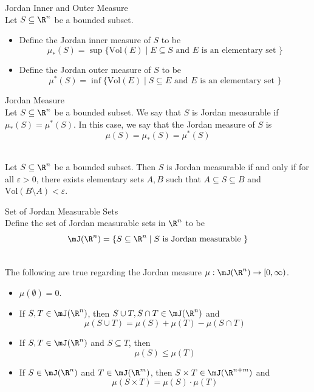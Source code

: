 \documentclass[a4paper]{article}
\begin{document}
\begin{defn}{Jordan Inner and Outer Measure}{}\\
Let $S\subseteq\R^n$ be a bounded subset. 
\begin{itemize}
\item Define the Jordan inner measure of $S$ to be $$\mu_\ast(S)=\sup\{\text{Vol}(E)\;|\;E\subseteq S\text{ and }E\text{ is an elementary set }\}$$
\item Define the Jordan outer measure of $S$ to be $$\mu^\ast(S)=\inf\{\text{Vol}(E)\;|\;S\subseteq E\text{ and }E\text{ is an elementary set }\}$$
\end{itemize}
\end{defn}

\begin{defn}{Jordan Measure}{}\\
Let $S\subseteq\R^n$ be a bounded subset. We say that $S$ is Jordan measurable if $\mu_\ast(S)=\mu^\ast(S)$. In this case, we say that the Jordan measure of $S$ is $$\mu(S)=\mu_\ast(S)=\mu^\ast(S)$$
\end{defn}

\begin{prp}{}{}\\
Let $S\subseteq\R^n$ be a bounded subset. Then $S$ is Jordan measurable if and only if for all $\varepsilon>0$, there exists elementary sets $A,B$ such that $A\subseteq S\subseteq B$ and $\text{Vol}(B\setminus A)<\varepsilon$. 
\end{prp}

\begin{defn}{Set of Jordan Measurable Sets}{}\\
Define the set of Jordan measurable sets in $\R^n$ to be $$\mJ(\R^n)=\{S\subseteq\R^n\;|\;S\text{ is Jordan measurable }\}$$
\end{defn}

\begin{prp}{}{}\\
The following are true regarding the Jordan measure $\mu:\mJ(\R^n)\to[0,\infty)$. 
\begin{itemize}
\item $\mu(\emptyset)=0$. 
\item If $S,T\in\mJ(\R^n)$, then $S\cup T,S\cap T\in\mJ(\R^n)$ and $$\mu(S\cup T)=\mu(S)+\mu(T)-\mu(S\cap T)$$
\item If $S,T\in\mJ(\R^n)$ and $S\subseteq T$, then $$\mu(S)\leq\mu(T)$$
\item If $S\in\mJ(\R^n)$ and $T\in\mJ(\R^m)$, then $S\times T\in\mJ(\R^{n+m})$ and $$\mu(S\times T)=\mu(S)\cdot\mu(T)$$
\end{itemize}
\end{prp}
\end{document}
